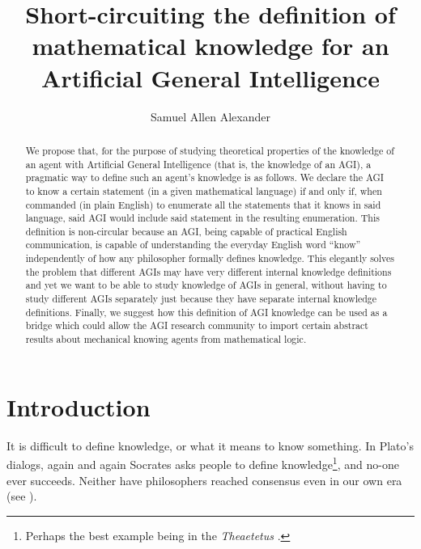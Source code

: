 \documentclass[runningheads]{llncs}
\begin{document}
\title{Short-circuiting the definition of mathematical knowledge for an
Artificial General Intelligence
}


\author{Samuel Allen
Alexander}



\maketitle

\begin{abstract}
We propose that, for the purpose of studying theoretical properties of
the knowledge of an agent with Artificial General Intelligence (that is, 
the knowledge of an AGI),
a pragmatic way to define such an agent's knowledge is as follows.
We declare the AGI to know a certain statement
(in a given mathematical language) if and only if, when commanded
(in plain English) to enumerate all the statements that it knows in
said language, said AGI
would include said statement in the resulting enumeration.
This definition is non-circular because an AGI, being capable of
practical English communication, is capable of understanding the everyday
English word ``know'' independently of how any philosopher formally
defines knowledge.
This elegantly solves the problem that different AGIs may have
very different internal knowledge definitions and yet we want
to be able to study knowledge of AGIs in general, without having
to study different AGIs separately just because they have separate
internal knowledge definitions. Finally, we suggest how this
definition of AGI knowledge can be used as a bridge which could
allow the AGI research community to import certain abstract results
about mechanical knowing agents from mathematical logic.
\end{abstract}

\section{Introduction}

It is difficult to define knowledge, or what it means to know something.
In Plato's dialogs, again and again Socrates asks people to define
knowledge\footnote{Perhaps the best example being in the \emph{Theaetetus}
\cite{theaetetus}.}, and no-one ever succeeds. Neither have philosophers
reached consensus even in our own era (see \cite{sep-knowledge-analysis}).
\end{document}
